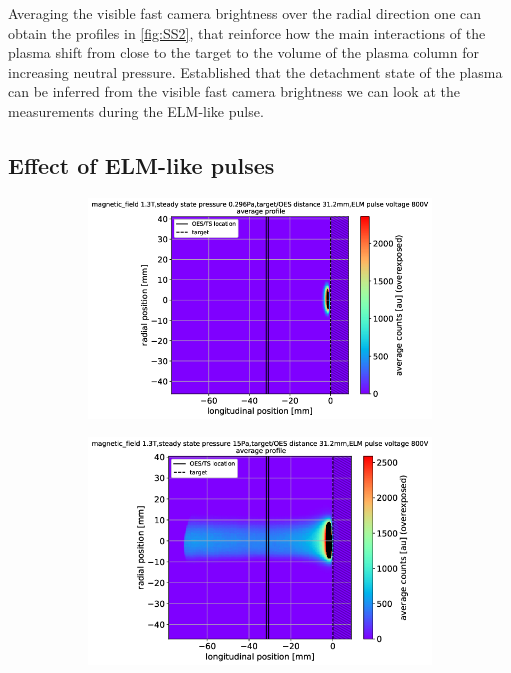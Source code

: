 Averaging the visible fast camera brightness over the radial direction one can obtain the profiles in \autoref{fig:SS2}, that reinforce how the main interactions of the plasma shift from close to the target to the volume of the plasma column for increasing neutral pressure. Established that the detachment state of the plasma can be inferred from the visible fast camera brightness we can look at the measurements during the ELM-like pulse.

\subsection{Effect of ELM-like pulses}\label{Effect of ELM-like pulses}

\begin{figure}
     \centering
     \begin{subfigure}{0.36\textwidth}
         \centering
         \vspace*{-0mm}
         \includegraphics[width=\textwidth,trim={20 0 8 8},clip]{Chapters/chapter3/figs/fast_camera_merge_95_average3.png}
         \vspace*{-17mm}
         {\color{white}\caption{\phantom{weww}}\label{fig:ELMa}}
     \end{subfigure}
     \hfill
     \begin{subfigure}{0.31\textwidth}
         \centering
         \vspace*{-0mm}
         \includegraphics[width=\textwidth,trim={34 0 8 7.5},clip]{Chapters/chapter3/figs/fast_camera_merge_85_average3.png}

\end{subfigure}
\end{figure}
